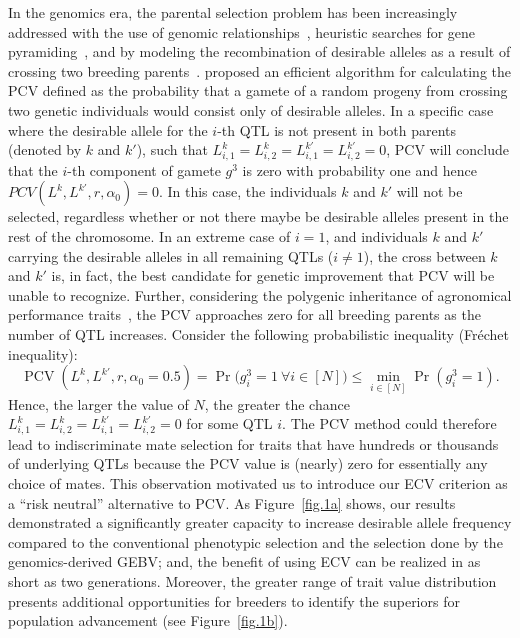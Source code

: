 \documentclass[12pt, a4paper, bibliography=totoc]{scrartcl}
\DeclareMathOperator*{\PCV}{PCV}
\begin{document}
In the genomics era, the parental selection problem has been increasingly addressed with the use of genomic relationships~\citep{sun2013mating}, heuristic searches for gene pyramiding~\citep{de2015heuristic}, and by modeling the recombination of desirable alleles as a result of crossing two breeding parents~\citep{han2017predicted}. \cite{han2017predicted} proposed an efficient  algorithm for calculating the PCV defined as the probability that a gamete of a random progeny from crossing two genetic individuals would consist only of desirable alleles. In a specific case where the desirable allele for the $i$-th QTL is not present in both parents (denoted by $k$ and $k'$), such that $L^k_{i,1}=L^k_{i,2}=L^{k'}_{i,1}=L^{k'}_{i,2}=0$, PCV will conclude that the $i$-th component of gamete $g^3$ is zero with probability one and hence $PCV(L^k,L^{k'},r,\alpha_0)=0$. In this case, the individuals $k$ and $k'$  will not be selected, regardless whether or not there maybe be desirable alleles present in the rest of the chromosome. In an extreme case of $i=1$, and individuals $k$ and $k'$ carrying the desirable alleles in all remaining QTLs ($i\not=1$), the cross between $k$ and $k'$ is, in fact, the best candidate for genetic improvement that PCV will be unable to recognize. Further, considering the polygenic inheritance of agronomical performance traits~\citep{lynch1998genetics, scott2021limited}, the PCV approaches zero for all breeding parents as the number of QTL increases. Consider the following probabilistic inequality (Fr\'echet inequality):
\begin{equation}\label{eq:upperbound}
   \PCV(L^k,L^{k'},r,\alpha_0=0.5) = \Pr\big(g^3_i=1\ \forall i\in[N]\big)\le \min_{i\in[N]}\Pr(g^3_i=1).
\end{equation}
Hence, the larger the value of $N$, the greater the chance  $L^k_{i,1}=L^k_{i,2}=L^{k'}_{i,1}=L^{k'}_{i,2}=0$ for some QTL $i$. The PCV method could therefore lead to indiscriminate mate selection for traits that have hundreds or thousands of underlying QTLs because the PCV value is (nearly) zero for essentially any choice of mates. This observation  motivated us to introduce our  ECV criterion as a ``risk neutral'' alternative to PCV. As Figure~\ref{fig.1a} shows, our results demonstrated a significantly greater capacity to increase desirable allele frequency compared to the conventional phenotypic selection and the selection done by the genomics-derived GEBV; and, the benefit of using ECV can be realized in as short as two generations. Moreover, the greater range of trait value distribution presents additional opportunities for breeders to identify the superiors for population advancement (see Figure~\ref{fig.1b}).
\end{document}

